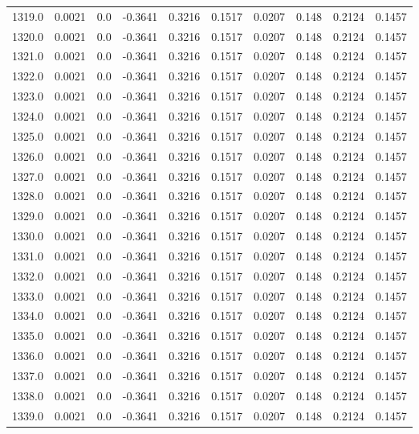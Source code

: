 \begin{longtable}{lrrrrrrrrr}
1319.0 & 0.0021 & 0.0 & -0.3641 & 0.3216 & 0.1517 & 0.0207 & 0.148 & 0.2124 & 0.1457 \\
1320.0 & 0.0021 & 0.0 & -0.3641 & 0.3216 & 0.1517 & 0.0207 & 0.148 & 0.2124 & 0.1457 \\
1321.0 & 0.0021 & 0.0 & -0.3641 & 0.3216 & 0.1517 & 0.0207 & 0.148 & 0.2124 & 0.1457 \\
1322.0 & 0.0021 & 0.0 & -0.3641 & 0.3216 & 0.1517 & 0.0207 & 0.148 & 0.2124 & 0.1457 \\
1323.0 & 0.0021 & 0.0 & -0.3641 & 0.3216 & 0.1517 & 0.0207 & 0.148 & 0.2124 & 0.1457 \\
1324.0 & 0.0021 & 0.0 & -0.3641 & 0.3216 & 0.1517 & 0.0207 & 0.148 & 0.2124 & 0.1457 \\
1325.0 & 0.0021 & 0.0 & -0.3641 & 0.3216 & 0.1517 & 0.0207 & 0.148 & 0.2124 & 0.1457 \\
1326.0 & 0.0021 & 0.0 & -0.3641 & 0.3216 & 0.1517 & 0.0207 & 0.148 & 0.2124 & 0.1457 \\
1327.0 & 0.0021 & 0.0 & -0.3641 & 0.3216 & 0.1517 & 0.0207 & 0.148 & 0.2124 & 0.1457 \\
1328.0 & 0.0021 & 0.0 & -0.3641 & 0.3216 & 0.1517 & 0.0207 & 0.148 & 0.2124 & 0.1457 \\
1329.0 & 0.0021 & 0.0 & -0.3641 & 0.3216 & 0.1517 & 0.0207 & 0.148 & 0.2124 & 0.1457 \\
1330.0 & 0.0021 & 0.0 & -0.3641 & 0.3216 & 0.1517 & 0.0207 & 0.148 & 0.2124 & 0.1457 \\
1331.0 & 0.0021 & 0.0 & -0.3641 & 0.3216 & 0.1517 & 0.0207 & 0.148 & 0.2124 & 0.1457 \\
1332.0 & 0.0021 & 0.0 & -0.3641 & 0.3216 & 0.1517 & 0.0207 & 0.148 & 0.2124 & 0.1457 \\
1333.0 & 0.0021 & 0.0 & -0.3641 & 0.3216 & 0.1517 & 0.0207 & 0.148 & 0.2124 & 0.1457 \\
1334.0 & 0.0021 & 0.0 & -0.3641 & 0.3216 & 0.1517 & 0.0207 & 0.148 & 0.2124 & 0.1457 \\
1335.0 & 0.0021 & 0.0 & -0.3641 & 0.3216 & 0.1517 & 0.0207 & 0.148 & 0.2124 & 0.1457 \\
1336.0 & 0.0021 & 0.0 & -0.3641 & 0.3216 & 0.1517 & 0.0207 & 0.148 & 0.2124 & 0.1457 \\
1337.0 & 0.0021 & 0.0 & -0.3641 & 0.3216 & 0.1517 & 0.0207 & 0.148 & 0.2124 & 0.1457 \\
1338.0 & 0.0021 & 0.0 & -0.3641 & 0.3216 & 0.1517 & 0.0207 & 0.148 & 0.2124 & 0.1457 \\
1339.0 & 0.0021 & 0.0 & -0.3641 & 0.3216 & 0.1517 & 0.0207 & 0.148 & 0.2124 & 0.1457 \\

\end{longtable}
